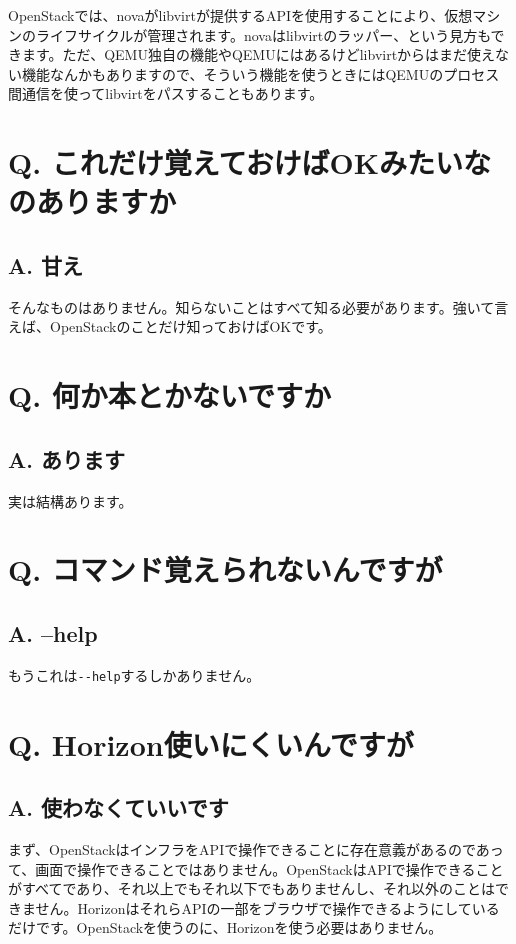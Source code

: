 \documentclass[9pt,b5paper,tombo,openany]{jsbook}
\begin{document}
OpenStackでは、novaがlibvirtが提供するAPIを使用することにより、仮想マシンのライフサイクルが管理されます。novaはlibvirtのラッパー、という見方もできます。ただ、QEMU独自の機能やQEMUにはあるけどlibvirtからはまだ使えない機能なんかもありますので、そういう機能を使うときにはQEMUのプロセス間通信を使ってlibvirtをパスすることもあります。

\section*{Q. これだけ覚えておけばOKみたいなのありますか}
\subsection*{A. 甘え}
そんなものはありません。知らないことはすべて知る必要があります。強いて言えば、OpenStackのことだけ知っておけばOKです。

\section*{Q. 何か本とかないですか}
\subsection*{A. あります}
実は結構あります。

\section*{Q. コマンド覚えられないんですが}
\subsection*{A. --help}
もうこれは\verb|--help|するしかありません。

\section*{Q. Horizon使いにくいんですが}
\subsection*{A. 使わなくていいです}
まず、OpenStackはインフラをAPIで操作できることに存在意義があるのであって、画面で操作できることではありません。OpenStackはAPIで操作できることがすべてであり、それ以上でもそれ以下でもありませんし、それ以外のことはできません。HorizonはそれらAPIの一部をブラウザで操作できるようにしているだけです。OpenStackを使うのに、Horizonを使う必要はありません。
\end{document}
